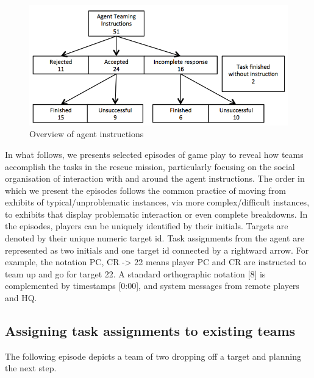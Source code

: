 \begin{figure}[ht]
 \includegraphics[width=1\textwidth]{img/study2/system/agentInstructions}
\caption{Overview of agent instructions}
\label{fig:study2agentInstructions}
\end{figure}

In what follows, we presents selected episodes of game play to reveal how teams accomplish the tasks in the rescue mission, particularly focusing on the social organisation of interaction with and around the agent instructions. The order in which we present the episodes follows the common practice of moving from exhibits of typical/unproblematic instances, via more complex/difficult instances, to exhibits that display problematic interaction or even complete breakdowns. In the episodes, players can be uniquely identified by their initials. Targets are denoted by their unique numeric target id. Task assignments from the agent are represented as two initials and one target id connected by a rightward arrow. For example, the notation PC, CR -> 22 means player PC and CR are instructed to team up and go for target 22. A standard orthographic notation [8] is complemented by timestamps [0:00], and system messages from remote players and HQ.  

\subsection{Assigning task assignments to existing teams}
The following episode depicts a team of two dropping off a target and planning the next step.\\

